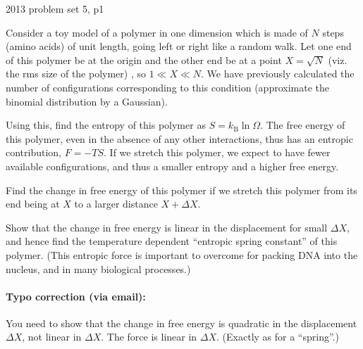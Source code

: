 {2013 problem set 5, p1}{
Consider a toy model of a polymer in one dimension which is made of $N$ steps (amino acids) of unit length, going left or right like a random walk. Let one end of this polymer be at the origin and the other end be at a point $X = \sqrt{N}$ (viz. the rms size of the polymer) , so $1 \ll X \ll N$. We have previously calculated the number of configurations corresponding to this condition (approximate the binomial distribution by a Gaussian). 

Using this, find the entropy of this polymer as $S = k_{\mathrm{B}} \ln \Omega$. The free energy of this polymer, even in the absence of any other interactions, thus has an entropic contribution, $F = -T S$. If we stretch this polymer, we expect to have fewer available configurations, and thus a smaller entropy and a higher free energy. 

Find the change in free energy of this polymer if we stretch this polymer from its end being at $X$ to a larger distance $X + \Delta X$. 

Show that the change in free energy is linear in the displacement for small $\Delta X$, and hence find the temperature dependent ``entropic spring constant'' of this polymer.  (This entropic force is important to overcome for packing DNA into the nucleus, and in many biological processes.)

\paragraph{Typo correction (via email): }
You need to show that the change in free energy is quadratic in the displacement $\Delta X$, not linear in $\Delta X$. The force is linear in $\Delta X$.  (Exactly as for a ``spring''.)
} %


